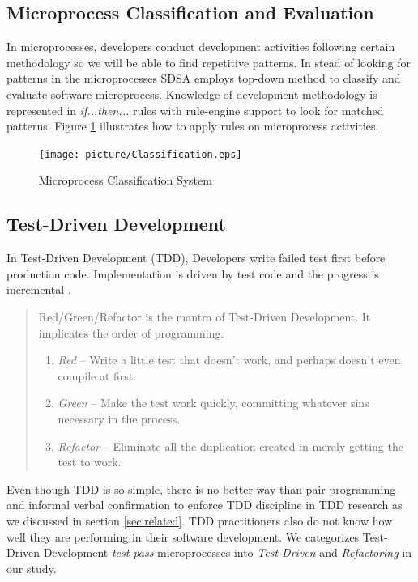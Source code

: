 \documentclass[11pt,twocolumn]{article}
\begin{document}
\subsection{Microprocess Classification and Evaluation}
In microprocesses, developers conduct development activities following
certain methodology so we will be able to find repetitive patterns. In
stead of looking for patterns in the microprocesses SDSA employs top-down
method to classify and evaluate software microprocess. Knowledge of
development methodology is represented in \textit{if...then...} rules with
rule-engine support to look for matched patterns. Figure
\ref{fig:Classification} illustrates how to apply rules on microprocess
activities.
\begin{figure}[ht] 
  \centering
  \texttt{[image: picture/Classification.eps]}
  \caption{Microprocess Classification System}\label{fig:Classification}
\end{figure} 

\subsection{Test-Driven Development}
In Test-Driven Development (TDD), Developers write failed test first before
production code. Implementation is driven by test code and the progress is
incremental \cite{Beck:03}.
\begin{quote}
  Red/Green/Refactor is the mantra of Test-Driven Development. It
  implicates the order of programming. 
  \begin{enumerate}
    \item \textit{Red} -- Write a little test that doesn't work, and perhaps
      doesn't even compile at first.
    \item \textit{Green} -- Make the test work quickly, committing whatever
       sins necessary in the process.
    \item \textit{Refactor} -- Eliminate all the duplication created in merely
       getting the test to work.
\end{enumerate}
\end{quote}

Even though TDD is so simple, there is no better way than pair-programming
and informal verbal confirmation to enforce TDD discipline in TDD research
as we discussed in section \ref{sec:related}. TDD practitioners also do not
know how well they are performing in their software development. We
categorizes Test-Driven Development \textit{test-pass} microprocesses into
\textit{Test-Driven} and \textit{Refactoring} in our study.
\end{document}
